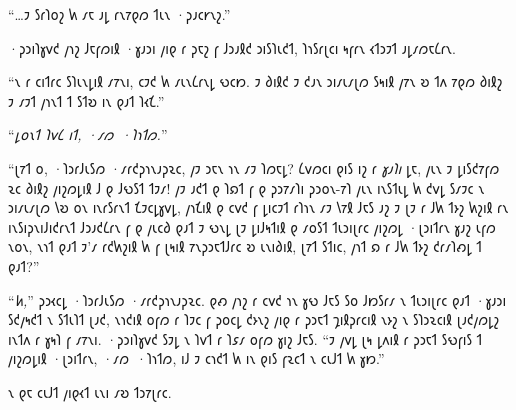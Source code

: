 “…𐑲 𐑕𐑩𐑐𐑴𐑟 𐑿 𐑥𐑱 𐑨𐑛 𐑩𐑯𐑳𐑞𐑼 𐑑𐑧𐑯 ·𐑜𐑨𐑤𐑾𐑯𐑟.”

·𐑜𐑮𐑦𐑐𐑣𐑫𐑒 𐑢𐑪𐑟 𐑓𐑱𐑝𐑼𐑦𐑙 ·𐑣𐑨𐑮𐑦 𐑢𐑦𐑞 𐑩 𐑜𐑱𐑟 𐑝 𐑓𐑮𐑨𐑙𐑒 𐑮𐑦𐑕𐑐𐑧𐑒𐑑, 𐑐𐑪𐑕𐑩𐑚𐑤𐑦 𐑰𐑝𐑩𐑯 𐑬𐑑𐑮𐑲𐑑 𐑨𐑛𐑥𐑼𐑱𐑖𐑩𐑯.

“𐑯 𐑩 𐑤𐑦𐑑𐑩𐑤 𐑕𐑐𐑧𐑯𐑛𐑦𐑙 𐑥𐑳𐑯𐑦, 𐑤𐑲𐑒 𐑿 𐑥𐑧𐑯𐑖𐑩𐑯𐑛 𐑻𐑤𐑽. 𐑲 𐑔𐑦𐑙𐑒 𐑲 𐑒𐑨𐑯 𐑮𐑦𐑥𐑧𐑥𐑚𐑼 𐑕𐑰𐑦𐑙 𐑢𐑳𐑯 𐑹 𐑑𐑵 𐑳𐑞𐑼 𐑔𐑦𐑙𐑟 𐑲 𐑥𐑲𐑑 𐑢𐑪𐑯𐑑 𐑑 𐑕𐑑𐑹 𐑦𐑯 𐑞𐑨𐑑 𐑐𐑬𐑗.”

“\emph{𐑛𐑴𐑯𐑑 𐑐𐑫𐑖 𐑦𐑑, ·𐑥𐑼~·𐑐𐑪𐑑𐑼.}”

“𐑚𐑳𐑑 𐑴, ·𐑐𐑮𐑩𐑓𐑧𐑕𐑼 ·𐑥𐑩𐑒𐑜𐑪𐑯𐑨𐑜𐑷𐑤, 𐑢𐑲 𐑮𐑱𐑯 𐑪𐑯 𐑥𐑲 𐑐𐑼𐑱𐑛? 𐑖𐑫𐑼𐑤𐑦 𐑞𐑦𐑕 𐑦𐑟 𐑩 \emph{𐑣𐑨𐑐𐑦} 𐑛𐑱, 𐑢𐑧𐑯 𐑲 𐑛𐑦𐑕𐑒𐑳𐑝𐑼 𐑷𐑤 𐑔𐑦𐑙𐑟 𐑢𐑦𐑟𐑼𐑛𐑦𐑙 𐑓 𐑞 𐑓𐑻𐑕𐑑 𐑑𐑲𐑥! 𐑢𐑲 𐑨𐑒𐑑 𐑞 𐑐𐑸𐑑 𐑝 𐑞 𐑜𐑮𐑳𐑥𐑐𐑦 𐑜𐑮𐑴𐑯-𐑳𐑐 𐑢𐑧𐑯 𐑦𐑯𐑕𐑑𐑧𐑛 𐑿 𐑒𐑫𐑛 𐑕𐑥𐑲𐑤 𐑯 𐑮𐑦𐑥𐑧𐑥𐑚𐑼 𐑘𐑹 𐑴𐑯 𐑦𐑯𐑩𐑕𐑩𐑯𐑑 𐑗𐑲𐑤𐑛𐑣𐑫𐑛, 𐑢𐑪𐑗𐑦𐑙 𐑞 𐑤𐑫𐑒 𐑝 𐑛𐑦𐑤𐑲𐑑 𐑩𐑐𐑪𐑯 𐑥𐑲 𐑘𐑳𐑙 𐑓𐑱𐑕 𐑨𐑟 𐑲 𐑚𐑲 𐑩 𐑓𐑿 𐑑𐑶𐑟 𐑿𐑟𐑦𐑙 𐑩𐑯 𐑦𐑯𐑕𐑦𐑜𐑯𐑦𐑓𐑦𐑒𐑩𐑯𐑑 𐑓𐑮𐑨𐑒𐑖𐑩𐑯 𐑝 𐑞 𐑢𐑧𐑤𐑔 𐑞𐑨𐑑 𐑲 𐑻𐑯𐑛 𐑚𐑲 𐑛𐑦𐑓𐑰𐑑𐑦𐑙 𐑞 𐑥𐑴𐑕𐑑 𐑑𐑧𐑮𐑦𐑚𐑩𐑤 𐑢𐑦𐑟𐑼𐑛 ·𐑚𐑮𐑦𐑑𐑩𐑯 𐑣𐑨𐑟 𐑧𐑝𐑼 𐑯𐑴𐑯, 𐑯𐑪𐑑 𐑞𐑨𐑑 𐑲'𐑥 𐑩𐑒𐑿𐑟𐑦𐑙 𐑿 𐑝 𐑚𐑰𐑦𐑙 𐑳𐑯𐑜𐑮𐑱𐑑𐑓𐑩𐑤 𐑹 𐑧𐑯𐑦𐑔𐑦𐑙, 𐑚𐑳𐑑 𐑕𐑑𐑦𐑤, 𐑢𐑪𐑑 𐑸 𐑩 𐑓𐑿 𐑑𐑶𐑟 𐑒𐑩𐑥𐑐𐑺𐑛 𐑑 𐑞𐑨𐑑?”

“\emph{𐑿,}” 𐑜𐑮𐑬𐑤𐑛 ·𐑐𐑮𐑩𐑓𐑧𐑕𐑼 ·𐑥𐑩𐑒𐑜𐑪𐑯𐑨𐑜𐑷𐑤. 𐑞𐑺 𐑢𐑪𐑟 𐑩 𐑤𐑫𐑒 𐑪𐑯 𐑣𐑻 𐑓𐑱𐑕 𐑕𐑴 𐑓𐑽𐑕𐑩𐑥 𐑯 𐑑𐑧𐑮𐑦𐑚𐑩𐑤 𐑞𐑨𐑑 ·𐑣𐑨𐑮𐑦 𐑕𐑒𐑢𐑰𐑒𐑑 𐑯 𐑕𐑑𐑧𐑐𐑑 𐑚𐑨𐑒, 𐑯𐑪𐑒𐑦𐑙 𐑴𐑝𐑼 𐑩 𐑐𐑲𐑤 𐑝 𐑜𐑴𐑤𐑛 𐑒𐑶𐑯𐑟 𐑢𐑦𐑞 𐑩 𐑜𐑮𐑱𐑑 𐑡𐑦𐑙𐑜𐑩𐑤𐑦𐑙 𐑯𐑶𐑟 𐑯 𐑕𐑐𐑮𐑷𐑤𐑦𐑙 𐑚𐑨𐑒𐑢𐑼𐑛𐑟 𐑦𐑯𐑑𐑵 𐑩 𐑣𐑰𐑐 𐑝 𐑥𐑳𐑯𐑦. ·𐑜𐑮𐑦𐑐𐑣𐑫𐑒 𐑕𐑲𐑛 𐑯 𐑐𐑫𐑑 𐑩 𐑐𐑭𐑥 𐑴𐑝𐑼 𐑣𐑦𐑟 𐑓𐑱𐑕. “𐑲 𐑢𐑫𐑛 𐑚𐑰 𐑛𐑵𐑦𐑙 𐑩 𐑜𐑮𐑱𐑑 𐑕𐑻𐑝𐑦𐑕 𐑑 𐑢𐑦𐑟𐑼𐑛𐑦𐑙 ·𐑚𐑮𐑦𐑑𐑩𐑯, ·𐑥𐑼~·𐑐𐑪𐑑𐑼, 𐑦𐑓 𐑲 𐑤𐑪𐑒𐑑 𐑿 𐑦𐑯 𐑞𐑦𐑕 𐑝𐑷𐑤𐑑 𐑯 𐑤𐑧𐑓𐑑 𐑿 𐑣𐑽.”

𐑯 𐑞𐑱 𐑤𐑧𐑓𐑑 𐑢𐑦𐑞𐑬𐑑 𐑧𐑯𐑦 𐑥𐑹 𐑑𐑮𐑳𐑚𐑩𐑤.

